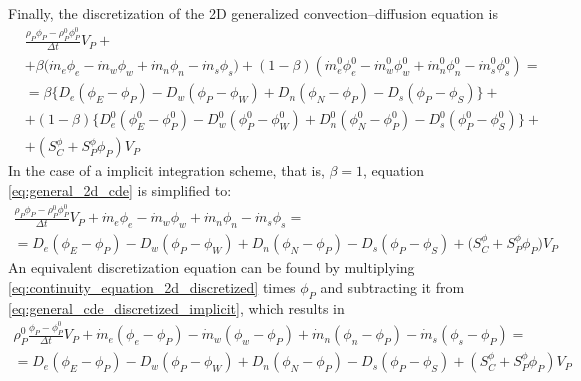 Finally, the discretization of the 2D generalized convection--diffusion equation is
\begin{align}
	&\frac{\rho_P \phi_P - \rho_P^0 \phi_P^0}{\Delta t} V_P + \nonumber \\
	&+ 
	\beta 
	\Big( \dot{m}_e \phi_e - \dot{m}_w \phi_w + \dot{m}_n \phi_n - \dot{m}_s \phi_s \Big) + 
	(1 - \beta) 
	\left( \dot{m}_e^0 \phi_e^0 - \dot{m}_w^0 \phi_w^0 + \dot{m}_n^0 \phi_n^0 - \dot{m}_s^0 \phi_s^0 \right) =  \nonumber \\
	&= 
	\beta 
	\Big\{ 
	D_e (\phi_E - \phi_P) - D_w (\phi_P - \phi_W) + D_n (\phi_N - \phi_P) - D_s (\phi_P - \phi_S) 
	\Big\} + \nonumber \\
	&+ (1 - \beta)
	\Big\{ 
	D_e^0 (\phi_E^0 - \phi_P^0) - D_w^0 (\phi_P^0 - \phi_W^0) + 
	D_n^0 (\phi_N^0 - \phi_P^0) - D_s^0 (\phi_P^0 - \phi_S^0)
	\Big\} + \nonumber \\
	&+ \left( S_C^\phi + S_P^\phi \phi_P \right) V_P \label{eq:general_2d_cde}
\end{align}
In the case of a implicit integration scheme, that is, $\beta = 1$, equation \eqref{eq:general_2d_cde} is simplified to:
\begin{multline} \label{eq:general_cde_discretized_implicit}
	\frac{\rho_P \phi_P - \rho_P^0 \phi_P^0}{\Delta t} V_P + 
	\dot{m}_e \phi_e - \dot{m}_w \phi_w + \dot{m}_n \phi_n - \dot{m}_s \phi_s = \\ = 
	D_e (\phi_E - \phi_P) - D_w (\phi_P - \phi_W) + D_n (\phi_N - \phi_P) - D_s (\phi_P - \phi_S) +
	\big( S_C^\phi + S_P^\phi \phi_P \big) V_P
\end{multline}
An equivalent discretization equation can be found by multiplying \eqref{eq:continuity_equation_2d_discretized} times $\phi_P$ and subtracting it from \eqref{eq:general_cde_discretized_implicit}, which results in
\begin{multline}
	\rho_P^0 \frac{\phi_P - \phi_P^0}{\Delta t} V_P
	+ \dot{m}_e (\phi_e - \phi_P) - \dot{m}_w (\phi_w - \phi_P) 
	+ \dot{m}_n (\phi_n - \phi_P) - \dot{m}_s (\phi_s - \phi_P) 
	= \\
	= D_e (\phi_E - \phi_P) - D_w (\phi_P - \phi_W)
	+ D_n (\phi_N - \phi_P) - D_s (\phi_P - \phi_S)
	+ (S_C^\phi + S_P^\phi \phi_P) V_P
\end{multline}


